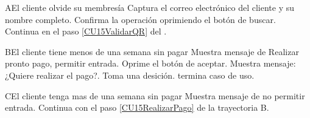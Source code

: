 		\begin{UCtrayectoriaA}{A}{El cliente olvide su membresía}
			\UCpaso[\UCactor] Captura el correo electrónico del cliente y su nombre completo.%
			\UCpaso[\UCactor] Confirma la operación oprimiendo el botón de buscar.%
			\UCpaso Continua en el paso \ref{CU15ValidarQR} del .
		\end{UCtrayectoriaA}
		
		\begin{UCtrayectoriaA}{B}{El cliente tiene menos de una semana sin pagar}
			\UCpaso Muestra mensaje de Realizar pronto pago, permitir entrada.
			\UCpaso[\UCactor] Oprime el botón de aceptar.%
			\UCpaso Muestra mensaje: ¿Quiere realizar el pago?.
			\UCpaso[\UCactor] Toma una desición.
			\UCpaso[] termina caso de uso.
		\end{UCtrayectoriaA}

		\begin{UCtrayectoriaA}{C}{El cliente tenga mas de una semana sin pagar}
			\UCpaso Muestra mensaje de no permitir entrada.%
			\UCpaso[\UCactor] Continua con el paso \ref{CU15RealizarPago} de la trayectoria B.
		\end{UCtrayectoriaA}

		
		
		



